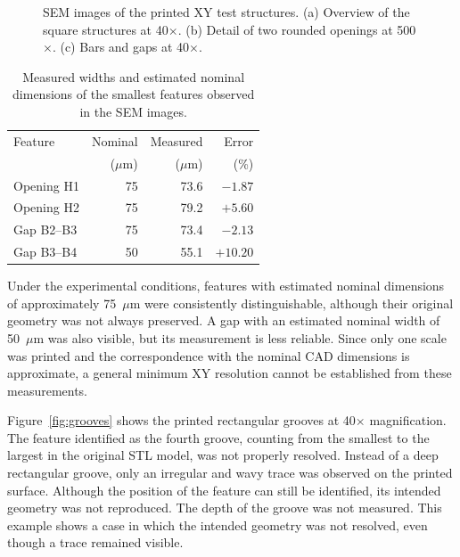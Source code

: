 \documentclass[10pt]{article}
\begin{document}
\begin{figure}[h]
\centering
{}\par\vspace{2mm}
\par\vspace{2mm}
\caption{SEM images of the printed XY test structures. (a) Overview of the square structures at 40$\times$. (b) Detail of two rounded openings at 500$\times$. (c) Bars and gaps at 40$\times$.}
\label{fig:semxy}
\end{figure}

\begin{table}[h]
\centering
\caption{Measured widths and estimated nominal dimensions of the smallest features observed in the SEM images.}
\label{tab:sem}
\footnotesize
\begin{tabular}{@{}lrrr@{}}
\toprule
Feature & Nominal & Measured & Error\\
 & ($\mu$m) & ($\mu$m) & (\%)\\
\midrule
Opening H1 & 75 & 73.6 & $-1.87$\\
Opening H2 & 75 & 79.2 & $+5.60$\\
Gap B2--B3 & 75 & 73.4 & $-2.13$\\
Gap B3--B4 & 50 & 55.1 & $+10.20$\\
\bottomrule
\end{tabular}
\end{table}

Under the experimental conditions, features with estimated nominal dimensions of approximately 75~$\mu$m were consistently distinguishable, although their original geometry was not always preserved. A gap with an estimated nominal width of 50~$\mu$m was also visible, but its measurement is less reliable. Since only one scale was printed and the correspondence with the nominal CAD dimensions is approximate, a general minimum XY resolution cannot be established from these measurements.

Figure~\ref{fig:grooves} shows the printed rectangular grooves at 40$\times$ magnification. The feature identified as the fourth groove, counting from the smallest to the largest in the original STL model, was not properly resolved. Instead of a deep rectangular groove, only an irregular and wavy trace was observed on the printed surface. Although the position of the feature can still be identified, its intended geometry was not reproduced. The depth of the groove was not measured. This example shows a case in which the intended geometry was not resolved, even though a trace remained visible.
\end{document}
